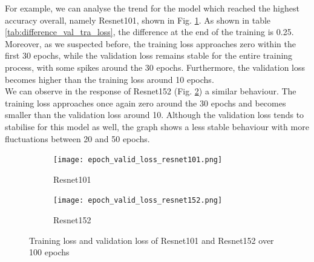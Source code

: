 For example, we can analyse the trend for the model which reached the highest accuracy overall, namely Resnet101, shown in Fig. \ref{fig:epoch_valid_loss_resnet101}. As shown in table \ref{tab:difference_val_tra_loss}, the difference at the end of the training is 0.25. Moreover, as we suspected before, the training loss approaches zero within the first 30 epochs, while the validation loss remains stable for the entire training process, with some spikes around the 30 epochs. Furthermore, the validation loss becomes higher than the training loss around 10 epochs.\\
We can observe in the response of Resnet152 (Fig. \ref{fig:epoch_valid_loss_resnet152}) a similar behaviour. The training loss approaches once again zero around the 30 epochs and becomes smaller than the validation loss around 10. Although the validation loss tends to stabilise for this model as well, the graph shows a less stable behaviour with more fluctuations between 20 and 50 epochs. \\
\begin{figure}[h]
\begin{subfigure}{0.5\textwidth}
     \centering
	    \texttt{[image: epoch\_valid\_loss\_resnet101.png]}
\caption{Resnet101}\label{fig:epoch_valid_loss_resnet101}
     \end{subfigure}
\begin{subfigure}{0.5\textwidth}
     \centering
	    \texttt{[image: epoch\_valid\_loss\_resnet152.png]}
\caption{Resnet152}\label{fig:epoch_valid_loss_resnet152}
     \end{subfigure}  
     \caption{Training loss and validation loss of Resnet101 and Resnet152 over 100 epochs}
        \label{fig:tran_valid_loss_seeds_res_100}
\end{figure}

